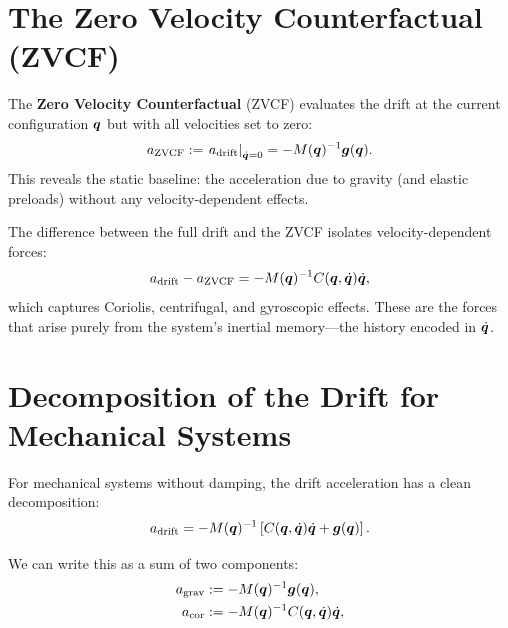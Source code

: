 \section{The Zero Velocity Counterfactual (ZVCF)}

\begin{definition}
\label{def:ch7:ZVCF}
The \textbf{Zero Velocity Counterfactual} (ZVCF) evaluates the drift at the current
configuration $\bm{q}$ but with all velocities set to zero:
\begin{equation}
a_{\text{ZVCF}} := \left.a_{\text{drift}}\right|_{\dot{\bm{q}}=0}
= -M(\bm{q})^{-1}\bm{g}(\bm{q}).
\label{eq:ch7:ZVCF}
\end{equation}
This reveals the static baseline: the acceleration due to gravity (and elastic
preloads) without any velocity-dependent effects.
\end{definition}

The difference between the full drift and the ZVCF isolates velocity-dependent forces:
\begin{equation}
a_{\text{drift}} - a_{\text{ZVCF}} = -M(\bm{q})^{-1}C(\bm{q},\dot{\bm{q}})\dot{\bm{q}},
\label{eq:ch7:velocity-contribution}
\end{equation}
which captures Coriolis, centrifugal, and gyroscopic effects. These are the forces that
arise purely from the system's inertial memory---the history encoded in $\dot{\bm{q}}$.

\section{Decomposition of the Drift for Mechanical Systems}

For mechanical systems without damping, the drift acceleration has a clean decomposition:
\begin{equation}
a_{\text{drift}} = -M(\bm{q})^{-1}\left[C(\bm{q},\dot{\bm{q}})\dot{\bm{q}} + \bm{g}(\bm{q})\right].
\label{eq:ch7:drift-decomposition}
\end{equation}

We can write this as a sum of two components:
\begin{subequations}
\label{eq:ch7:drift-components}
\begin{align}
a_{\text{grav}} &:= -M(\bm{q})^{-1}\bm{g}(\bm{q}), \label{eq:ch7:a-grav}\\
a_{\text{cor}} &:= -M(\bm{q})^{-1}C(\bm{q},\dot{\bm{q}})\dot{\bm{q}}, \label{eq:ch7:a-cor}
\end{align}
\end{subequations}

